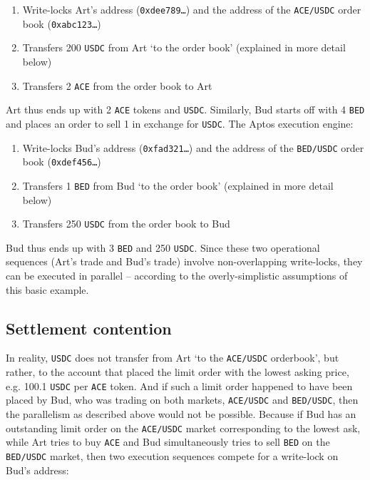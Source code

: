 \documentclass{scrartcl}
\begin{document}
\begin{enumerate}
    \item Write-locks Art's address (\texttt{0xdee789\ldots}) and the address of the \texttt{ACE/USDC} order book (\texttt{0xabc123\ldots})
    \item Transfers 200 \texttt{USDC} from Art `to the order book' (explained in more detail below)
    \item Transfers 2 \texttt{ACE} from the order book to Art
\end{enumerate}

Art thus ends up with 2 \texttt{ACE} tokens and \texttt{USDC}.
Similarly, Bud starts off with 4 \texttt{BED} and places an order to sell 1 in exchange for \texttt{USDC}.
The Aptos execution engine:

\begin{enumerate}
    \item Write-locks Bud's address (\texttt{0xfad321\ldots}) and the address of the \texttt{BED/USDC} order book (\texttt{0xdef456\ldots})
    \item Transfers 1 \texttt{BED} from Bud `to the order book' (explained in more detail below)
    \item Transfers 250 \texttt{USDC} from the order book to Bud
\end{enumerate}

Bud thus ends up with 3 \texttt{BED} and 250 \texttt{USDC}.
Since these two operational sequences (Art's trade and Bud's trade) involve non-overlapping write-locks, they can be executed in parallel -- according to the overly-simplistic assumptions of this basic example.

\subsection{Settlement contention}

In reality, \texttt{USDC} does not transfer from Art `to the \texttt{ACE/USDC} orderbook', but rather, to the account that placed the limit order with the lowest asking price, e.g. 100.1 \texttt{USDC} per \texttt{ACE} token.
And if such a limit order happened to have been placed by Bud, who was trading on both markets, \texttt{ACE/USDC} and \texttt{BED/USDC}, then the parallelism as described above would not be possible.
Because if Bud has an outstanding limit order on the \texttt{ACE/USDC} market corresponding to the lowest ask, while Art tries to buy \texttt{ACE} and Bud simultaneously tries to sell \texttt{BED} on the \texttt{BED/USDC} market, then two execution sequences compete for a write-lock on Bud's address:
\end{document}
